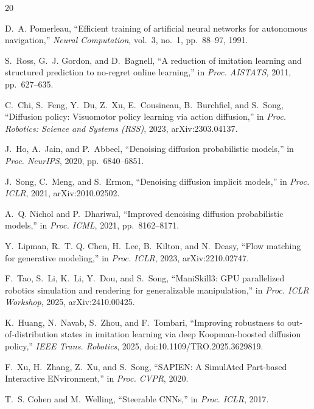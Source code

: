 \documentclass[twocolumn]{article}
\begin{document}

\begin{thebibliography}{20}

D.~A. Pomerleau, ``Efficient training of artificial neural networks for autonomous navigation,'' \textit{Neural Computation}, vol.~3, no.~1, pp.~88--97, 1991.

S.~Ross, G.~J. Gordon, and D.~Bagnell, ``A reduction of imitation learning and structured prediction to no-regret online learning,'' in \textit{Proc. AISTATS}, 2011, pp.~627--635.

C.~Chi, S.~Feng, Y.~Du, Z.~Xu, E.~Cousineau, B.~Burchfiel, and S.~Song, ``Diffusion policy: Visuomotor policy learning via action diffusion,'' in \textit{Proc. Robotics: Science and Systems (RSS)}, 2023, arXiv:2303.04137.

J.~Ho, A.~Jain, and P.~Abbeel, ``Denoising diffusion probabilistic models,'' in \textit{Proc. NeurIPS}, 2020, pp.~6840--6851.

J.~Song, C.~Meng, and S.~Ermon, ``Denoising diffusion implicit models,'' in \textit{Proc. ICLR}, 2021, arXiv:2010.02502.

A.~Q. Nichol and P.~Dhariwal, ``Improved denoising diffusion probabilistic models,'' in \textit{Proc. ICML}, 2021, pp.~8162--8171.

Y.~Lipman, R.~T. Q. Chen, H.~Lee, B.~Kilton, and N.~Deasy, ``Flow matching for generative modeling,'' in \textit{Proc. ICLR}, 2023, arXiv:2210.02747.

F.~Tao, S.~Li, K.~Li, Y.~Dou, and S.~Song, ``ManiSkill3: GPU parallelized robotics simulation and rendering for generalizable manipulation,'' in \textit{Proc. ICLR Workshop}, 2025, arXiv:2410.00425.

K.~Huang, N.~Navab, S.~Zhou, and F.~Tombari, ``Improving robustness to out-of-distribution states in imitation learning via deep Koopman-boosted diffusion policy,'' \textit{IEEE Trans. Robotics}, 2025, doi:10.1109/TRO.2025.3629819.

F.~Xu, H.~Zhang, Z.~Xu, and S.~Song, ``SAPIEN: A SimulAted Part-based Interactive ENvironment,'' in \textit{Proc. CVPR}, 2020.

T.~S. Cohen and M.~Welling, ``Steerable CNNs,'' in \textit{Proc. ICLR}, 2017.


\end{thebibliography}
\end{document}
